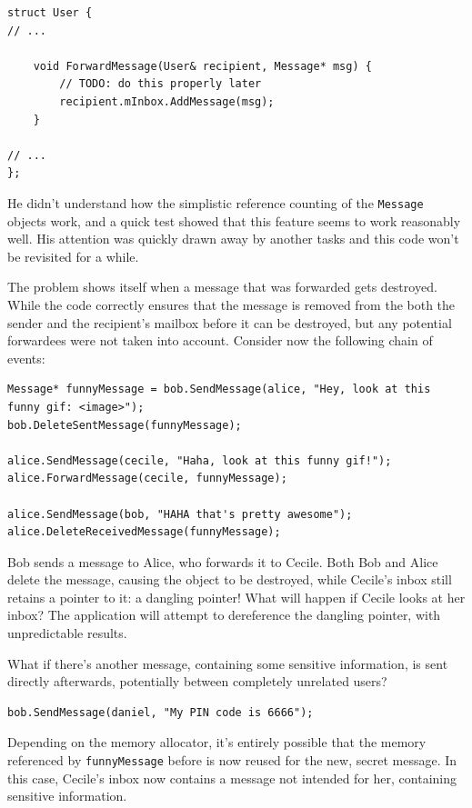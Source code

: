\begin{lstlisting}
struct User {
// ...

	void ForwardMessage(User& recipient, Message* msg) {
		// TODO: do this properly later
		recipient.mInbox.AddMessage(msg);
	}

// ...
};
\end{lstlisting}

He didn't understand how the simplistic reference counting of the \lstinline!Message! objects work, and a quick test showed that this feature seems to work reasonably well. His attention was quickly drawn away by another tasks and this code won't be revisited for a while.

The problem shows itself when a message that was forwarded gets destroyed. While the code correctly ensures that the message is removed from the both the sender and the recipient's mailbox before it can be destroyed, but any potential forwardees were not taken into account. Consider now the following chain of events:

\begin{lstlisting}
Message* funnyMessage = bob.SendMessage(alice, "Hey, look at this funny gif: <image>");
bob.DeleteSentMessage(funnyMessage);

alice.SendMessage(cecile, "Haha, look at this funny gif!");
alice.ForwardMessage(cecile, funnyMessage);

alice.SendMessage(bob, "HAHA that's pretty awesome");
alice.DeleteReceivedMessage(funnyMessage);
\end{lstlisting}

Bob sends a message to Alice, who forwards it to Cecile. Both Bob and Alice delete the message, causing the object to be destroyed, while Cecile's inbox still retains a pointer to it: a dangling pointer! What will happen if Cecile looks at her inbox? The application will attempt to dereference the dangling pointer, with unpredictable results.

What if there's another message, containing some sensitive information, is sent directly afterwards, potentially between completely unrelated users?

\begin{lstlisting}
bob.SendMessage(daniel, "My PIN code is 6666");
\end{lstlisting}

Depending on the memory allocator, it's entirely possible that the memory referenced by \lstinline!funnyMessage! before is now reused for the new, secret message. In this case, Cecile's inbox now contains a message not intended for her, containing sensitive information.


